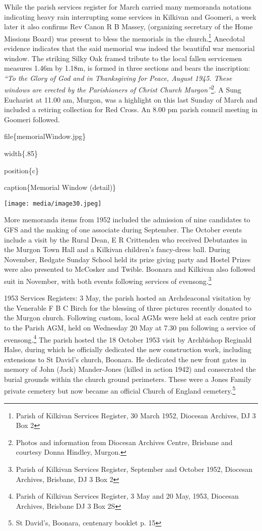 While the parish services register for March carried many memoranda notations indicating heavy rain interrupting some services in Kilkivan and Goomeri, a week later it also confirms Rev Canon R B Massey, (organizing secretary of the Home Missions Board) was present to bless the memorials in the church.\footnote{Parish of Kilkivan Services Register, 30 March 1952, Diocesan Archives, DJ 3 Box 2} Anecdotal evidence indicates that the said memorial was indeed the beautiful war memorial window. The striking Silky Oak framed tribute to the local fallen servicemen measures 1.46m by 1.18m, is formed in three sections and bears the inscription: \emph{``To the Glory of God and in Thanksgiving for Peace, August 1945. These windows are erected by the Parishioners of Christ Church Murgon''}\footnote{Photos and information from Diocesan Archives Centre, Brisbane and courtesy Donna Hindley, Murgon.}. A Sung Eucharist at 11.00 am, Murgon, was a highlight on this last Sunday of March and included a retiring collection for Red Cross. An 8.00 pm parish council meeting in Goomeri followed.

file\{memorialWindow.jpg\}

width\{.85\}

position\{c\}

caption\{Memorial Window (detail)\}

\texttt{[image: media/image30.jpeg]}

More memoranda items from 1952 included the admission of nine candidates to GFS and the making of one associate during September. The October events include a visit by the Rural Dean, E R Crittenden who received Debutantes in the Murgon Town Hall and a Kilkivan children's fancy-dress ball. During November, Redgate Sunday School held its prize giving party and Hostel Prizes were also presented to McCosker and Twible. Boonara and Kilkivan also followed suit in November, with both events following services of evensong.\footnote{Parish of Kilkivan Services Register, September and October 1952, Diocesan Archives, Brisbane, DJ 3 Box 2}

1953 Services Registers: 3 May, the parish hosted an Archdeaconal visitation by the Venerable F B C Birch for the blessing of three pictures recently donated to the Murgon church. Following custom, local AGMs were held at each centre prior to the Parish AGM, held on Wednesday 20 May at 7.30 pm following a service of evensong.\footnote{Parish of Kilkivan Services Register, 3 May and 20 May, 1953, Diocesan Archives, Brisbane DJ 3 Box 2S} The parish hosted the 18 October 1953 visit by Archbishop Reginald Halse, during which he officially dedicated the new construction work, including extensions to St David's church, Boonara. He dedicated the new front gates in memory of John (Jack) Mander-Jones (killed in action 1942) and consecrated the burial grounds within the church ground perimeters. These were a Jones Family private cemetery but now became an official Church of England cemetery.\footnote{St David's, Boonara, centenary booklet p. 15}

